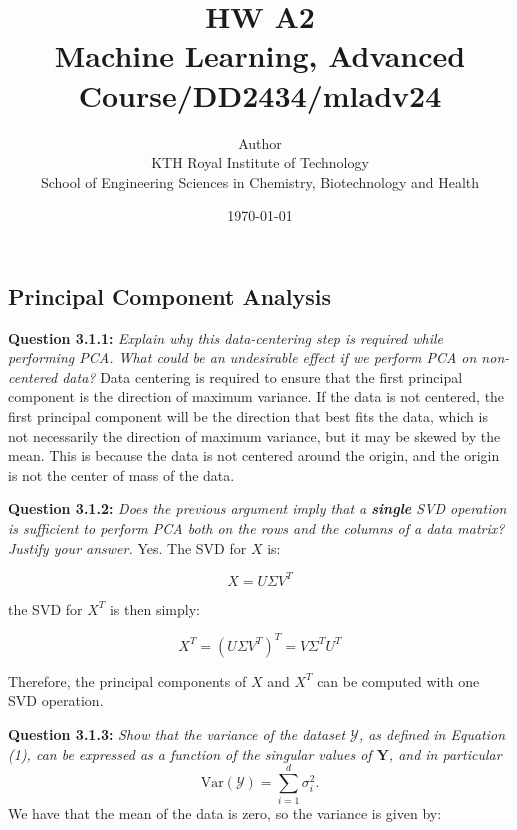 \documentclass{article}
\title{HW A2\\\Large{Machine Learning, Advanced Course/DD2434/mladv24}}
\author{Author \\ KTH Royal Institute of Technology\\ School of Engineering Sciences in Chemistry, Biotechnology and Health}
\date{\today}
\begin{document}
\maketitle

\fancyfoot[C]{\thepage}
\begin{multicols}{2}

    \section{Principal Component Analysis}

    \noindent \textbf{Question 3.1.1:}  
    \textit{Explain why this data-centering step is required while performing PCA. What could be an undesirable effect if we perform PCA on non-centered data?}  
    Data centering is required to ensure that the first principal component is the direction of maximum variance. If the data is not centered, 
    the first principal component will be the direction that best fits the data, which is not necessarily the direction of maximum variance, but it may be 
    skewed by the mean.
    This is because the data is not centered around the origin, and the origin is not the center of mass of the data. 

    \noindent \textbf{Question 3.1.2:}  
    \textit{Does the previous argument imply that a \textbf{single} SVD operation is sufficient to perform PCA both on the rows and the columns of a data matrix? Justify your answer.}  
    Yes. The SVD for $X$ is:

    \begin{equation*}
        X = U \Sigma V^T
    \end{equation*}

    the SVD for $X^T$ is then simply:

    \begin{equation*}
        X^T = (U \Sigma V^T)^T = V \Sigma^T U^T
    \end{equation*}

     Therefore, the principal components of $X$ and $X^T$ can be computed with one SVD operation.
    \vspace{0.5cm}

    \noindent \textbf{Question 3.1.3:}  
    \textit{Show that the variance of the dataset \( \mathcal{Y} \), as defined in Equation (1), can be expressed as a function of the singular values of \( \mathbf{Y} \), and in particular}  
    \[
    \text{Var}(\mathcal{Y}) = \sum_{i=1}^d \sigma_i^2.
    \]
    We have that the mean of the data is zero, so the variance is given by:


\end{multicols}
\end{document}

